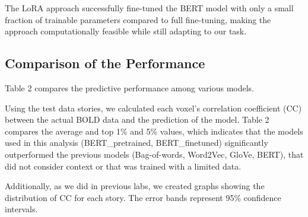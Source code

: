 \documentclass[12pt,letterpaper]{article}
\begin{document}
The LoRA approach successfully fine-tuned the BERT model with only a small fraction of trainable parameters compared to full fine-tuning, making the approach computationally feasible while still adapting to our task.


\subsection{Comparison of the Performance}
Table 2 compares the predictive performance among various models.

Using the test data stories, we calculated each voxel's correlation coefficient (CC) between the actual BOLD data and the prediction of the model. Table 2 compares the average and top 1\% and 5\% values, which indicates that the models used in this analysis (BERT\_pretrained, BERT\_finetuned) significantly outperformed the previous models (Bag-of-words, Word2Vec, GloVe, BERT), that did not consider context or that was trained with a limited data.


\begin{table}[H]
    \centering
    \caption{Correlation Coefficient per subject for different embedding models}
    \label{tab:accuracy_values}
\end{table}

Additionally, as we did in previous labs, we created graphs showing the distribution of CC for each story. The error bands represent 95\% confidence intervals. 
\end{document}

